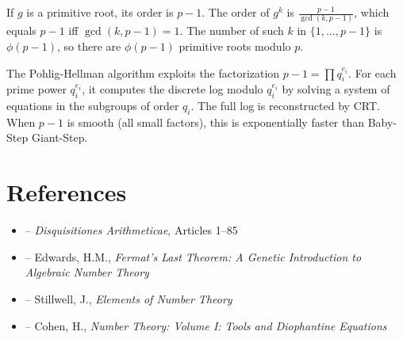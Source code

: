 \begin{solution}
If $g$ is a primitive root, its order is $p-1$. The order of $g^k$ is $\frac{p-1}{\gcd(k, p-1)}$, which equals $p-1$ iff $\gcd(k, p-1) = 1$. The number of such $k$ in $\{1, \ldots, p-1\}$ is $\phi(p-1)$, so there are $\phi(p-1)$ primitive roots modulo $p$.
\end{solution}

\begin{solution}
The Pohlig-Hellman algorithm exploits the factorization $p-1 = \prod q_i^{e_i}$. For each prime power $q_i^{e_i}$, it computes the discrete log modulo $q_i^{e_i}$ by solving a system of equations in the subgroups of order $q_i$. The full log is reconstructed by CRT. When $p-1$ is smooth (all small factors), this is exponentially faster than Baby-Step Giant-Step.
\end{solution}


\section{References}

\begin{itemize}
    \item \cite{gauss-disq} -- \textit{Disquisitiones Arithmeticae}, Articles 1--85
    \item \cite{edwards-fermat} -- Edwards, H.M., \textit{Fermat's Last Theorem: A Genetic Introduction to Algebraic Number Theory}
    \item \cite{stillwell-number-theory} -- Stillwell, J., \textit{Elements of Number Theory}
    \item \cite{cohen-number-theory} -- Cohen, H., \textit{Number Theory: Volume I: Tools and Diophantine Equations}
\end{itemize}